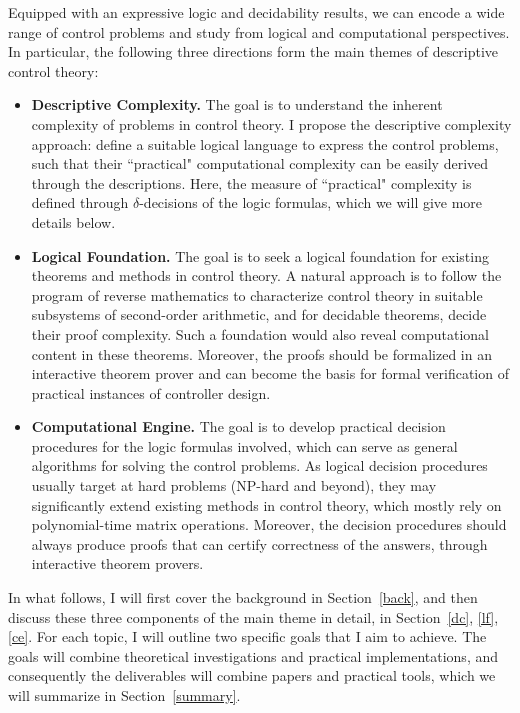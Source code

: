 \documentclass[10pt]{article}
\theoremstyle{definition}
\begin{document}
Equipped with an expressive logic and decidability results, we can encode a wide range of control problems and study from logical and computational perspectives. In particular, the following three directions form the main themes of descriptive control theory: 
\begin{itemize}
\item {\bf Descriptive Complexity.} The goal is to understand the inherent complexity of problems in control theory. I propose the descriptive complexity approach: define a suitable logical language to express the control problems, such that their ``practical" computational complexity can be easily derived through the descriptions. Here, the measure of ``practical" complexity is defined through $\delta$-decisions of the logic formulas, which we will give more details below. 
\item {\bf Logical Foundation.} The goal is to seek a logical foundation for existing theorems and methods in control theory. A natural approach is to follow the program of reverse mathematics to characterize control theory in suitable subsystems of second-order arithmetic, and for decidable theorems, decide their proof complexity. Such a foundation would also reveal computational content in these theorems. Moreover, the proofs should be formalized in an interactive theorem prover and can become the basis for formal verification of practical instances of controller design. 
\item {\bf Computational Engine.} The goal is to develop practical decision procedures for the logic formulas involved, which can serve as general algorithms for solving the control problems. As logical decision procedures usually target at hard problems (NP-hard and beyond), they may significantly extend existing methods in control theory, which mostly rely on polynomial-time matrix operations. Moreover, the decision procedures should always produce proofs that can certify correctness of the answers, through interactive theorem provers. 
\end{itemize}
In what follows, I will first cover the background in Section~\ref{back}, and then discuss these three components of the main theme in detail, in Section~\ref{dc}, \ref{lf}, \ref{ce}. For each topic, I will outline two specific goals that I aim to achieve. The goals will combine theoretical investigations and practical implementations, and consequently the deliverables will combine papers and practical tools, which we will summarize in Section~\ref{summary}. 
\end{document}
